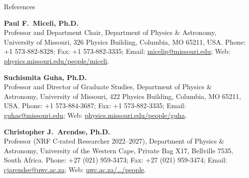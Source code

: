 
\begin{rubric}{References}

\noindent\textbf{Paul F.\ Miceli, Ph.D.}\\
Professor and Department Chair, Department of Physics \& Astronomy, University of Missouri, 326 Physics Building, Columbia, MO 65211, USA. Phone: +1 573‑882‑8328; Fax: +1 573‑882‑3335; Email: \href{mailto:micelip@missouri.edu}{micelip@missouri.edu}; Web: \href{https://physics.missouri.edu/people/miceli}{physics.missouri.edu/people/miceli}.

\medskip

\noindent\textbf{Suchismita Guha, Ph.D.}\\
Professor and Director of Graduate Studies, Department of Physics \& Astronomy, University of Missouri, 422 Physics Building, Columbia, MO 65211, USA. Phone: +1 573‑884‑3687; Fax: +1 573‑882‑3335; Email: \href{mailto:guhas@missouri.edu}{guhas@missouri.edu}; Web: \href{https://physics.missouri.edu/people/guha}{physics.missouri.edu/people/guha}.

\medskip

\noindent\textbf{Christopher J.\ Arendse, Ph.D.}\\
Professor (NRF C‑rated Researcher 2022–2027), Department of Physics \& Astronomy, University of the Western Cape, Private Bag X17, Bellville 7535, South Africa. Phone: +27 (021) 959‑3473; Fax: +27 (021) 959‑3474; Email: \href{mailto:cjarendse@uwc.ac.za}{cjarendse@uwc.ac.za}; Web: \href{https://www.uwc.ac.za/study/all-areas-of-study/departments/department-of-physics-and-astronomy/people}{uwc.ac.za/…/people}.

\end{rubric}
